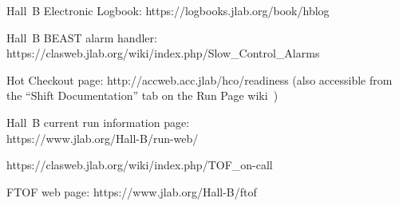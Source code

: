\documentclass[12pt]{article}
\begin{document}
\clearpage

\vfil
\eject

\begin{thebibliography}{99}

Hall~B Electronic Logbook: https://logbooks.jlab.org/book/hblog

Hall~B BEAST alarm handler: \\
https://clasweb.jlab.org/wiki/index.php/Slow\_Control\_Alarms

Hot Checkout page: http://accweb.acc.jlab/hco/readiness (also accessible from the
``Shift Documentation'' tab on the Run Page wiki~\cite{run-page})

Hall~B current run information page:\\
https://www.jlab.org/Hall-B/run-web/

https://clasweb.jlab.org/wiki/index.php/TOF\_on-call

FTOF web page: https://www.jlab.org/Hall-B/ftof

\end{thebibliography}
\end{document}
